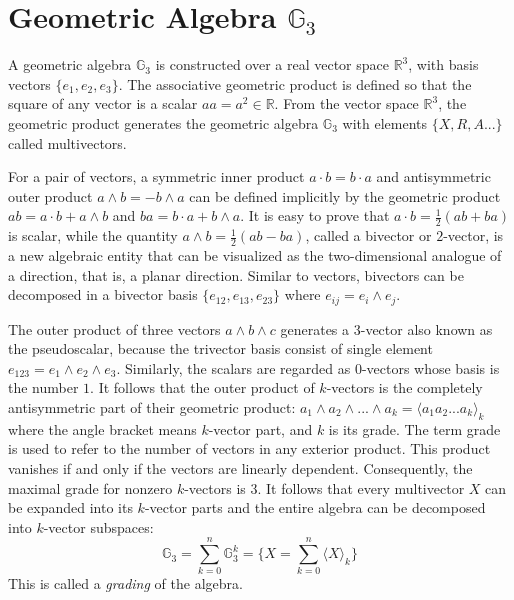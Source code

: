 \documentclass{birkjour}
\numberwithin{equation}{section}
\begin{document}
\section{Geometric Algebra $\mathbb{G}_3$}

A geometric algebra $\mathbb{G}_3$ is constructed over a real vector space $\mathbb R^3$, with basis vectors $\{e_1, e_2, e_3\}$. The associative geometric product is defined so that the square of any vector is a scalar $a a = a^2 \in \mathbb{R}$. From the vector space $\mathbb R^3$, the geometric product generates the geometric algebra $\mathbb{G}_3$ with elements $\{ X, R, A...\}$ called multivectors.

For a pair of vectors, a symmetric inner product $a \cdot b = b \cdot a$ and antisymmetric outer product $a \wedge b = -b \wedge a$ can be defined implicitly by the geometric product $a b = a \cdot b + a \wedge b$ and $b a = b \cdot a + b \wedge a$. It is easy to prove that $a \cdot b = \frac{1}{2}(a b + b a)$ is scalar, while the quantity $a \wedge b = \frac{1}{2}(a b - b a)$, called a bivector or $2$-vector, is a new algebraic entity that can be visualized as the two-dimensional analogue of a direction, that is, a planar direction. Similar to vectors, bivectors can be decomposed in a bivector basis $\{ e_{12}, e_{13}, e_{23} \}$ where $e_{ij} = e_i \wedge e_j$.

The outer product of three vectors $a \wedge b \wedge c$ generates a $3$-vector also known as the pseudoscalar, because the trivector basis consist of single element $e_{123} = e_1 \wedge e_2 \wedge e_3$. Similarly, the scalars are regarded as $0$-vectors whose basis is the number $1$. It follows that the outer product of $k$-vectors is the completely antisymmetric part of their geometric product: $a_1 \wedge a_2 \wedge ... \wedge a_k = \langle a_1 a_2 ... a_k \rangle_k$ where the angle bracket means $k$-vector part, and $k$ is its grade. The term grade is used to refer to the number of vectors in any exterior product. This product vanishes if and only if the vectors are linearly dependent. Consequently, the maximal grade for nonzero $k$-vectors is $3$. It follows that every multivector $X$ can be expanded into its $k$-vector parts and the entire algebra can be decomposed into $k$-vector subspaces:
\begin{equation*}
\mathbb G_3 = \sum_{k=0}^n{\mathbb{G}^k_3} = \{ X = \sum_{k=0}^n { \langle X \rangle_k } \}
\end{equation*}
This is called a \emph{grading} of the algebra. 
\end{document}
